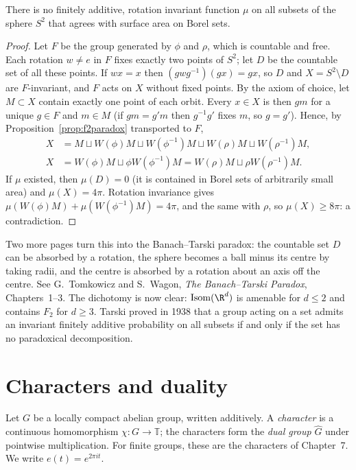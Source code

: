 \begin{theorem}[Hausdorff, 1914]\label{thm:hausdorff}
There is no finitely additive, rotation invariant function $\mu$ on all subsets of the sphere $S^2$ that agrees with surface area on Borel sets.
\end{theorem}
\begin{proof}
Let $F$ be the group generated by $\phi$ and $\rho$, which is countable and free. Each rotation $w\ne e$ in $F$ fixes exactly two points of $S^2$; let $D$ be the
countable set of all these points. If $wx=x$ then $(gwg^{-1})(gx)=gx$, so $D$ and $X=S^2\setminus D$ are $F$-invariant, and $F$ acts on $X$ without fixed points. By the axiom
of choice, let $M\subset X$ contain exactly one point of each orbit. Every $x\in X$ is then $gm$ for a unique $g\in F$ and $m\in M$ (if $gm=g'm$ then $g^{-1}g'$ fixes $m$, so
$g=g'$). Hence, by Proposition~\ref{prop:f2paradox} transported to $F$,
\[\begin{aligned}X&=M\sqcup W(\phi)M\sqcup W(\phi^{-1})M\sqcup W(\rho)M\sqcup W(\rho^{-1})M,\\X&=W(\phi)M\sqcup\phi W(\phi^{-1})M=W(\rho)M\sqcup\rho W(\rho^{-1})M.\end{aligned}\]
If $\mu$ existed, then $\mu(D)=0$ (it is contained in Borel sets of arbitrarily small area) and $\mu(X)=4\pi$. Rotation invariance gives
$\mu(W(\phi)M)+\mu(W(\phi^{-1})M)=4\pi$, and the same with $\rho$, so $\mu(X)\ge8\pi$: a contradiction.
\end{proof}

\begin{remark}
Two more pages turn this into the Banach--Tarski paradox: the countable set $D$ can be absorbed by a rotation, the sphere becomes a ball minus its centre by
taking radii, and the centre is absorbed by a rotation about an axis off the centre. See G.~Tomkowicz and S.~Wagon, \emph{The Banach--Tarski Paradox}, Chapters~1--3.
The dichotomy is now clear: $\mathrm{Isom}(\R^d)$ is amenable for $d\le2$ and contains $F_2$ for $d\ge3$. Tarski proved in 1938 that a group acting on a set admits an
invariant finitely additive probability on all subsets if and only if the set has no paradoxical decomposition.
\end{remark}

\section{Characters and duality}

Let $G$ be a locally compact abelian group, written additively. A \emph{character} is a continuous homomorphism $\chi:G\to\mathbb T$; the characters form the
\emph{dual group} $\widehat G$ under pointwise multiplication. For finite groups, these are the characters of Chapter~7. We write $e(t)=e^{2\pi it}$.

